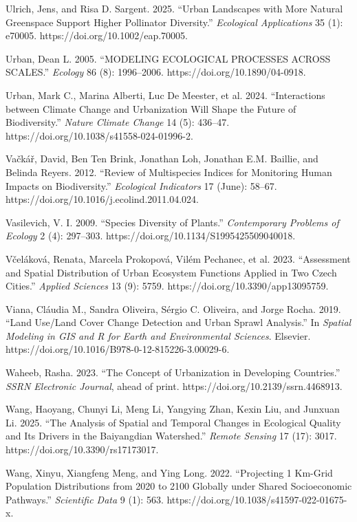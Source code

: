 Ulrich, Jens, and Risa D. Sargent. 2025. ``Urban Landscapes with More Natural Greenspace Support Higher Pollinator Diversity.'' \emph{Ecological Applications} 35 (1): e70005. https://doi.org/10.1002/eap.70005.

Urban, Dean L. 2005. ``MODELING ECOLOGICAL PROCESSES ACROSS SCALES.'' \emph{Ecology} 86 (8): 1996--2006. https://doi.org/10.1890/04-0918.

Urban, Mark C., Marina Alberti, Luc De Meester, et al. 2024. ``Interactions between Climate Change and Urbanization Will Shape the Future of Biodiversity.'' \emph{Nature Climate Change} 14 (5): 436--47. https://doi.org/10.1038/s41558-024-01996-2.

Vačkář, David, Ben Ten Brink, Jonathan Loh, Jonathan E.M. Baillie, and Belinda Reyers. 2012. ``Review of Multispecies Indices for Monitoring Human Impacts on Biodiversity.'' \emph{Ecological Indicators} 17 (June): 58--67. https://doi.org/10.1016/j.ecolind.2011.04.024.

Vasilevich, V. I. 2009. ``Species Diversity of Plants.'' \emph{Contemporary Problems of Ecology} 2 (4): 297--303. https://doi.org/10.1134/S1995425509040018.

Včeláková, Renata, Marcela Prokopová, Vilém Pechanec, et al. 2023. ``Assessment and Spatial Distribution of Urban Ecosystem Functions Applied in Two Czech Cities.'' \emph{Applied Sciences} 13 (9): 5759. https://doi.org/10.3390/app13095759.

Viana, Cláudia M., Sandra Oliveira, Sérgio C. Oliveira, and Jorge Rocha. 2019. ``Land Use/Land Cover Change Detection and Urban Sprawl Analysis.'' In \emph{Spatial Modeling in GIS and R for Earth and Environmental Sciences}. Elsevier. https://doi.org/10.1016/B978-0-12-815226-3.00029-6.

Waheeb, Rasha. 2023. ``The Concept of Urbanization in Developing Countries.'' \emph{SSRN Electronic Journal}, ahead of print. https://doi.org/10.2139/ssrn.4468913.

Wang, Haoyang, Chunyi Li, Meng Li, Yangying Zhan, Kexin Liu, and Junxuan Li. 2025. ``The Analysis of Spatial and Temporal Changes in Ecological Quality and Its Drivers in the Baiyangdian Watershed.'' \emph{Remote Sensing} 17 (17): 3017. https://doi.org/10.3390/rs17173017.

Wang, Xinyu, Xiangfeng Meng, and Ying Long. 2022. ``Projecting 1 Km-Grid Population Distributions from 2020 to 2100 Globally under Shared Socioeconomic Pathways.'' \emph{Scientific Data} 9 (1): 563. https://doi.org/10.1038/s41597-022-01675-x.

